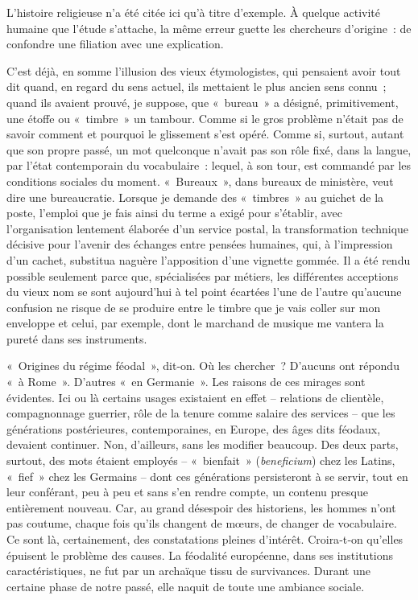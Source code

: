 \documentclass[french,twoside]{book} %
\begin{document}
\noindent L’histoire religieuse n’a été citée ici qu’à titre d’exemple. À quelque activité humaine que l’étude s’attache, la même erreur guette les cher­cheurs d’origine : de confondre une filiation avec une explication.\par
C’est déjà, en somme l’illusion des vieux étymologistes, qui pensaient avoir tout dit quand, en regard du sens actuel, ils mettaient le plus ancien  
\label{p8} sens connu ; quand ils avaient prouvé, je suppose, que « bureau » a désigné, primitivement, une étoffe ou « timbre » un tambour. Comme si le gros problème n’était pas de savoir comment et pourquoi le glissement s’est opéré. Comme si, surtout, autant que son propre passé, un mot quelconque n’avait pas son rôle fixé, dans la langue, par l’état contemporain du vocabulaire : lequel, à son tour, est commandé par les conditions sociales du moment. « Bureaux », dans bureaux de ministère, veut dire une bureaucratie. Lorsque je demande des « timbres » au guichet de la poste, l’emploi que je fais ainsi du terme a exigé pour s’établir, avec l’organisation lentement élaborée d’un service postal, la transformation technique décisive pour l’avenir des échanges entre pensées humaines, qui, à l’impression d’un cachet, substitua naguère l’apposition d’une vignette gommée. Il a été rendu possible seulement parce que, spécialisées par métiers, les diffé­rentes acceptions du vieux nom se sont aujourd’hui à tel point écartées l’une de l’autre qu’aucune confusion ne risque de se produire entre le timbre que je vais coller sur mon enveloppe et celui, par exemple, dont le marchand de musique me vantera la pureté dans ses instruments.\par
« Origines du régime féodal », dit‑on. Où les chercher ? D’aucuns ont répondu « à Rome ». D’autres « en Germanie ». Les raisons de ces mirages sont évidentes. Ici ou là certains usages existaient en effet – relations de clientèle, compagnonnage guerrier, rôle de la tenure comme salaire des services – que les générations postérieures, contemporaines, en Europe, des âges dits féodaux, devaient continuer. Non, d’ailleurs, sans les modifier beaucoup. Des deux parts, surtout, des mots étaient employés – « bienfait » (\emph{beneficium}) chez les Latins, « fief » chez les Germains – dont ces générations persisteront à se servir, tout en leur conférant, peu à peu et sans s’en rendre compte, un contenu presque entièrement nouveau. Car, au grand désespoir des historiens, les hommes n’ont pas coutume, chaque fois qu’ils changent de mœurs, de changer de vocabulaire. Ce sont là, certainement, des constatations pleines d’intérêt. Croira‑t‑on qu’elles épuisent le problème des causes. La féodalité européenne, dans ses insti­tutions caractéristiques, ne fut par un archaïque tissu de survivances. Durant une certaine phase de notre passé, elle naquit de toute une ambiance sociale.\par
\end{document}
